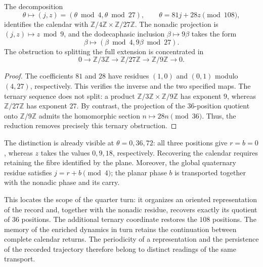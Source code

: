 \begin{proposition}
\label{ins29:xii:extension}
The decomposition
\[
 \theta\longmapsto(j,z)=(\theta\bmod4,\theta\bmod27),
 \qquad \theta=81j+28z\pmod{108},
\]
identifies the calendar with
\(\mathbb Z/4\mathbb Z\times\mathbb Z/27\mathbb Z\).
The nonadic projection is \((j,z)\mapsto z\bmod9\), and the
dodecaphasic inclusion \(\beta\mapsto9\beta\) takes the form
\[
 \beta\longmapsto(\beta\bmod4,9\beta\bmod27).
\]
The obstruction to splitting the full extension is concentrated in
\[
 0\longrightarrow\mathbb Z/3\mathbb Z
 \longrightarrow\mathbb Z/27\mathbb Z
 \longrightarrow\mathbb Z/9\mathbb Z\longrightarrow0.
\]
\end{proposition}
\begin{proof}
The coefficients \(81\) and \(28\) have residues \((1,0)\) and \((0,1)\)
modulo \((4,27)\), respectively. This verifies the inverse and the two
specified maps. The ternary sequence does not split: a product
\(\mathbb Z/3\mathbb Z\times\mathbb Z/9\mathbb Z\) has exponent
\(9\), whereas \(\mathbb Z/27\mathbb Z\) has exponent \(27\).
By contrast, the projection of the \(36\)-position quotient onto
\(\mathbb Z/9\mathbb Z\) admits the homomorphic section
\(n\mapsto28n\pmod{36}\). Thus, the reduction removes precisely
this ternary obstruction.
\end{proof}

The distinction is already visible at \(\theta=0,36,72\): all three
positions give \(r=b=0\), whereas \(z\) takes the values \(0,9,18\),
respectively. Recovering the calendar requires retaining the fibre
identified by the plane. Moreover, the global quaternary residue satisfies
\(j=r+b\pmod4\); the planar phase \(b\) is transported together with
the nonadic phase and its carry.

This locates the scope of the quarter turn: it organizes an oriented
representation of the record and, together with the nonadic residue,
recovers exactly its quotient of \(36\) positions. The additional ternary
coordinate restores the \(108\) positions. The memory of the enriched
dynamics in turn retains the continuation between complete calendar returns.
The periodicity of a representation and the persistence of the recorded
trajectory therefore belong to distinct readings of the same transport.

